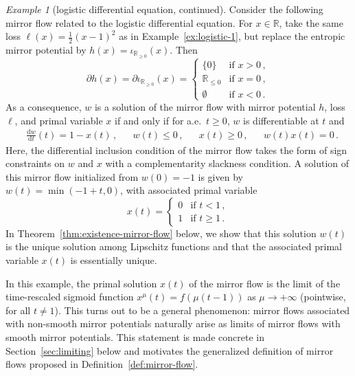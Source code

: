 \documentclass[11pt,english,reqno]{article}
\newcommand{\diff}{\mathrm{d}}
\newcommand{\R}{\mathbb{R}}
\renewcommand{\leq}{\leqslant}
\renewcommand{\geq}{\geqslant}
\theoremstyle{plain}
\theoremstyle{definition}
\theoremstyle{remark}
\newtheorem{example}[proposition]{Example}
\numberwithin{equation}{section}
\begin{document}
\begin{example}[logistic differential equation, continued]
	\label{ex:logistic-2}
		Consider the following mirror flow related to the logistic differential equation. For $x \in \R$, take the same loss $\ell(x) = \frac{1}{2}(x-1)^2$ as in Example~\ref{ex:logistic-1}, but replace the entropic mirror potential by $h(x) = \iota_{\R_{\geq 0}}(x)$. Then
	\begin{equation*}
		\partial h(x) = \partial \iota_{\R_{\geq 0}}(x) = \begin{cases}
			\{0\} & \text{if } x > 0 \, , \\
			\R_{\leq 0} & \text{if } x = 0 \, , \\
			\emptyset & \text{if } x < 0 \, .
		\end{cases}
	\end{equation*}
	As a consequence, $w$ is a solution of the mirror flow with mirror potential $h$, loss $\ell$, and primal variable $x$ if and only if for a.e.~$t \geq 0$, $w$ is differentiable at $t$ and
	\begin{align*}
		&\frac{\diff w}{\diff t}(t) = 1 - x(t) \, ,  &&w(t) \leq 0 \, , &&x(t) \geq 0 \, , &&w(t)x(t) = 0 \, . 
	\end{align*}
	Here, the differential inclusion condition of the mirror flow takes the form of sign constraints on $w$ and $x$ with a complementarity slackness condition. A solution of this mirror flow initialized from $w(0) = -1$ is given by $w(t) = \min(-1+t,0)$, with associated primal variable 
	\begin{equation}
		\label{eq:logistic-primal}
	x(t) = \begin{cases}
		0 & \text{if } t < 1 \, , \\
		1 & \text{if } t \geq 1 \, .
	\end{cases}
	\end{equation}
		In Theorem~\ref{thm:existence-mirror-flow} below, we show that this solution $w(t)$ is the unique solution among Lipschitz functions and that the associated primal variable $x(t)$ is essentially unique.

	In this example, the primal solution $x(t)$ of the mirror flow is the limit of the time-rescaled sigmoid function $x^\mu(t) = f(\mu (t-1))$ as $\mu \to +\infty$ (pointwise, for all $t \neq 1$). This turns out to be a general phenomenon: mirror flows associated with non-smooth mirror potentials naturally arise as limits of mirror flows with smooth mirror potentials. This statement is made concrete in Section~\ref{sec:limiting} below and motivates the generalized definition of mirror flows proposed in Definition~\ref{def:mirror-flow}.
\end{example}
\end{document}
